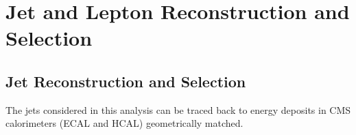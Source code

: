 \section{Jet and Lepton Reconstruction and Selection}

\subsection{Jet Reconstruction and Selection}
\label{jetRecoAndSelection}
The jets considered in this analysis can be traced back to energy deposits in CMS
calorimeters (ECAL and HCAL) geometrically matched.


